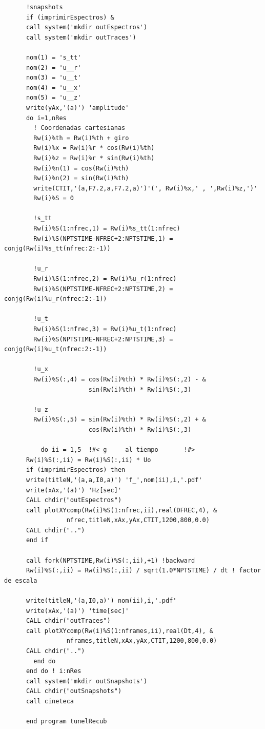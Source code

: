 \documentclass [11pt,spanish]{article}
\begin{document}
\begingroup
\fontsize{10pt}{12pt}
\selectfont
{}
\begin{shaded}
\begin{verbatim}
      !snapshots 
      if (imprimirEspectros) &
      call system('mkdir outEspectros')
      call system('mkdir outTraces')
        
      nom(1) = 's_tt'
      nom(2) = 'u__r'
      nom(3) = 'u__t'
      nom(4) = 'u__x'
      nom(5) = 'u__z'
      write(yAx,'(a)') 'amplitude'
      do i=1,nRes
        ! Coordenadas cartesianas
        Rw(i)%th = Rw(i)%th + giro
        Rw(i)%x = Rw(i)%r * cos(Rw(i)%th)
        Rw(i)%z = Rw(i)%r * sin(Rw(i)%th)
        Rw(i)%n(1) = cos(Rw(i)%th)
        Rw(i)%n(2) = sin(Rw(i)%th)
        write(CTIT,'(a,F7.2,a,F7.2,a)')'(', Rw(i)%x,' , ',Rw(i)%z,')'
        Rw(i)%S = 0
        
        !s_tt
        Rw(i)%S(1:nfrec,1) = Rw(i)%s_tt(1:nfrec)
        Rw(i)%S(NPTSTIME-NFREC+2:NPTSTIME,1) = conjg(Rw(i)%s_tt(nfrec:2:-1)) 
        
        !u_r
        Rw(i)%S(1:nfrec,2) = Rw(i)%u_r(1:nfrec)
        Rw(i)%S(NPTSTIME-NFREC+2:NPTSTIME,2) = conjg(Rw(i)%u_r(nfrec:2:-1)) 
        
        !u_t
        Rw(i)%S(1:nfrec,3) = Rw(i)%u_t(1:nfrec)
        Rw(i)%S(NPTSTIME-NFREC+2:NPTSTIME,3) = conjg(Rw(i)%u_t(nfrec:2:-1)) 
        
        !u_x
        Rw(i)%S(:,4) = cos(Rw(i)%th) * Rw(i)%S(:,2) - &
                       sin(Rw(i)%th) * Rw(i)%S(:,3)
        
        !u_z
        Rw(i)%S(:,5) = sin(Rw(i)%th) * Rw(i)%S(:,2) + &
                       cos(Rw(i)%th) * Rw(i)%S(:,3)
        
          do ii = 1,5  !#< g     al tiempo       !#>
      Rw(i)%S(:,ii) = Rw(i)%S(:,ii) * Uo
      if (imprimirEspectros) then
      write(titleN,'(a,a,I0,a)') 'f_',nom(ii),i,'.pdf'
      write(xAx,'(a)') 'Hz[sec]'
      CALL chdir("outEspectros")
      call plotXYcomp(Rw(i)%S(1:nfrec,ii),real(DFREC,4), & 
                 nfrec,titleN,xAx,yAx,CTIT,1200,800,0.0)
      CALL chdir("..")
      end if
      
      call fork(NPTSTIME,Rw(i)%S(:,ii),+1) !backward
      Rw(i)%S(:,ii) = Rw(i)%S(:,ii) / sqrt(1.0*NPTSTIME) / dt ! factor de escala
     
      write(titleN,'(a,I0,a)') nom(ii),i,'.pdf'
      write(xAx,'(a)') 'time[sec]'
      CALL chdir("outTraces")
      call plotXYcomp(Rw(i)%S(1:nframes,ii),real(Dt,4), & 
                 nframes,titleN,xAx,yAx,CTIT,1200,800,0.0)
      CALL chdir("..")
        end do
      end do ! i:nRes
      call system('mkdir outSnapshots')
      CALL chdir("outSnapshots")
      call cineteca
      
      end program tunelRecub
\end{verbatim}
\end{shaded}
\end{document}
